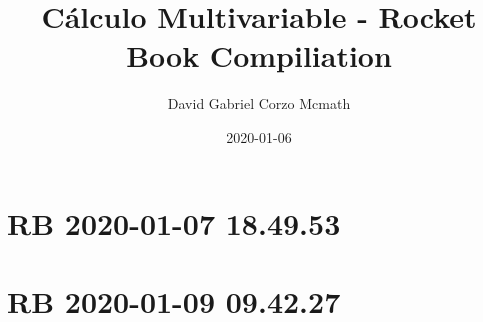 \documentclass{book}
\title{Cálculo Multivariable  - Rocket Book Compiliation}
\author{David Gabriel Corzo Mcmath}
\date{2020-01-06}
\begin{document}
\maketitle
\tableofcontents

\chapter{ RB 2020-01-07 18.49.53 }




\chapter{ RB 2020-01-09 09.42.27 }



\end{document}

